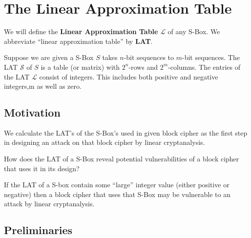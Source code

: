 \chapter{The Linear Approximation Table}

We will define the \textbf{Linear Approximation Table} $\mathcal{L}$ of any S-Box. We abbreviate ``linear approximation table'' by \textbf{LAT}.

Suppose we are given a S-Box $S$ takes $n$-bit sequences to $m$-bit sequences. The LAT $\mathcal{S}$ of $S$ is a table (or matrix) with $2^n$-rows and $2^m$-columns. The entries of the LAT $\mathcal{L}$ consist of integers. This includes both positive and negative integers,m as well as zero.

\section{Motivation}

We calculate the LAT's of the S-Box's used in given block cipher as the first step in designing an attack on that block cipher by linear cryptanalysis.

How does the LAT of a S-Box reveal potential vulnerabilities of a block cipher that uses it in its design?
\begin{tcolorbox}
If the LAT of a S-box contain some ``large'' integer value (either positive or negative) then a block cipher that uses that S-Box may be vulnerable to an attack by linear cryptanalysis.
\end{tcolorbox}

\section{Preliminaries}
